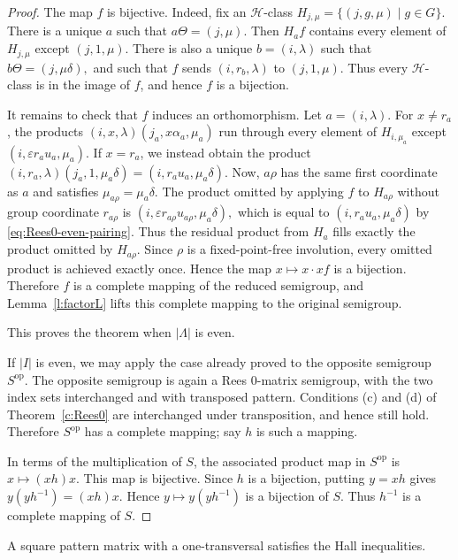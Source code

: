 \documentclass[11pt]{article}
\theoremstyle{plain}
\theoremstyle{remark}
\theoremstyle{definition}
\theoremstyle{plain}
\begin{document}
\begin{proof}
The map $f$ is bijective. Indeed, fix an $\mathcal H$-class
\(H_{j,\mu}=\{(j,g,\mu)\mid g\in G\}.\)
There is a unique $a$ such that
\(a\Theta=(j,\mu).\)
Then $H_a f$ contains every element of $H_{j,\mu}$
except $(j,1,\mu)$. There is also a unique $b=(i, \lambda)$ such that
\(b\Theta=(j,\mu\delta),\)
and such that $f$ sends $(i,r_b, \lambda)$ to $(j,1,\mu)$. Thus every
$\mathcal{H}$-class is in the image of $f$, and hence $f$ is a bijection.

It remains to check that $f$ induces an orthomorphism. Let $a=(i,\lambda)$. For $x\ne r_a$, the products
\((i,x,\lambda)(j_a,x\alpha_a,\mu_a)\)
run through every element of
\(H_{i,\mu_a}\)
except
\((i,\varepsilon r_au_a,\mu_a).\)
If $x=r_a$, we instead obtain the product
\((i,r_a,\lambda)(j_a,1,\mu_a\delta) = (i,r_au_a,\mu_a\delta).\)
Now, $a\rho$ has the same first coordinate as $a$ and satisfies
\(\mu_{a\rho}=\mu_a\delta.\)
The product omitted by applying $f$ to $H_{a\rho}$ without group coordinate $r_{a\rho}$ is
\((i,\varepsilon r_{a\rho}u_{a\rho},\mu_a\delta),\)
which is equal to
\((i,r_au_a,\mu_a\delta)\)
by \eqref{eq:Rees0-even-pairing}. Thus the residual product from $H_a$ fills exactly the product omitted by $H_{a\rho}$. Since $\rho$ is
a fixed-point-free involution, every omitted product is achieved exactly once.
Hence the map
\(x\longmapsto x\cdot xf\)
is a bijection. Therefore $f$ is a complete mapping of the reduced semigroup,
and Lemma~\ref{l:factorL} lifts this complete mapping to the original
semigroup.

This proves the theorem when $|\Lambda|$ is even.

If $|I|$ is even, we may apply the case already proved to the opposite
semigroup $S^{\mathrm{op}}$. The opposite semigroup is again a Rees
$0$-matrix semigroup, with the two index sets interchanged and with transposed
pattern. Conditions (c) and (d) of Theorem~\ref{c:Rees0} are interchanged
under transposition, and hence still hold. Therefore $S^{\mathrm{op}}$ has a
complete mapping; say $h$ is such a mapping.

In terms of the multiplication of $S$, the associated product map in
$S^{\mathrm{op}}$ is
\(x\longmapsto (xh)x.\)
This map is bijective. Since $h$ is a bijection, putting $y=xh$ gives
\(y(yh^{-1})=(xh)x.\)
Hence
\(y\longmapsto y(yh^{-1})\)
is a bijection of $S$. Thus $h^{-1}$ is a complete mapping of $S$.
\end{proof}

A square pattern matrix with a one-transversal satisfies the Hall inequalities.
\end{document}
